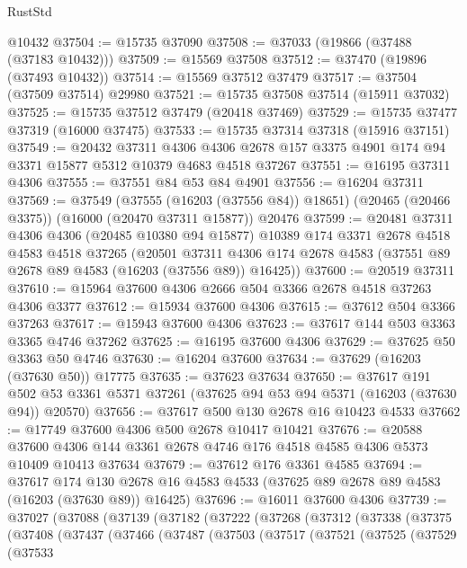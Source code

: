 \begin{lexlean}{RustStd}
\begin{coremodule}
    @10432
@37504 := @15735 @37090
@37508 := @37033 (@19866 (@37488 (@37183 @10432)))
@37509 := @15569 @37508
@37512 := @37470 (@19896 (@37493 @10432))
@37514 := @15569 @37512 @37479
@37517 := @37504 (@37509 @37514) @29980
@37521 := @15735 @37508 @37514 (@15911 @37032)
@37525 := @15735 @37512 @37479 (@20418 @37469)
@37529 := @15735 @37477 @37319 (@16000 @37475)
@37533 := @15735 @37314 @37318 (@15916 @37151)
@37549 := @20432
    @37311
    @4306
    @4306
    @2678
    @157
    @3375
    @4901
    @174
    @94
    @3371
    @15877
    @5312
    @10379
    @4683
    @4518
    @37267
@37551 := @16195 @37311 @4306
@37555 := @37551 @84 @53 @84 @4901
@37556 := @16204 @37311
@37569 := @37549
    (@37555 (@16203 (@37556 @84)) @18651)
    (@20465 (@20466 @3375))
    (@16000 (@20470 @37311 @15877))
    @20476
@37599 := @20481
    @37311
    @4306
    @4306
    (@20485 @10380 @94 @15877)
    @10389
    @174
    @3371
    @2678
    @4518
    @4583
    @4518
    @37265
    (@20501 @37311 @4306 @174 @2678 @4583 (@37551 @89 @2678 @89 @4583 (@16203 (@37556 @89)) @16425))
@37600 := @20519 @37311
@37610 := @15964 @37600 @4306 @2666 @504 @3366 @2678 @4518 @37263 @4306 @3377
@37612 := @15934 @37600 @4306
@37615 := @37612 @504 @3366 @37263
@37617 := @15943 @37600 @4306
@37623 := @37617 @144 @503 @3363 @3365 @4746 @37262
@37625 := @16195 @37600 @4306
@37629 := @37625 @50 @3363 @50 @4746
@37630 := @16204 @37600
@37634 := @37629 (@16203 (@37630 @50)) @17775
@37635 := @37623 @37634
@37650 := @37617
    @191
    @502
    @53
    @3361
    @5371
    @37261
    (@37625 @94 @53 @94 @5371 (@16203 (@37630 @94)) @20570)
@37656 := @37617 @500 @130 @2678 @16 @10423 @4533
@37662 := @17749 @37600 @4306 @500 @2678 @10417 @10421
@37676 := @20588
    @37600
    @4306
    @144
    @3361
    @2678
    @4746
    @176
    @4518
    @4585
    @4306
    @5373
    @10409
    @10413
    @37634
@37679 := @37612 @176 @3361 @4585
@37694 := @37617
    @174
    @130
    @2678
    @16
    @4583
    @4533
    (@37625 @89 @2678 @89 @4583 (@16203 (@37630 @89)) @16425)
@37696 := @16011 @37600 @4306
@37739 := @37027
    (@37088
      (@37139
        (@37182
          (@37222
            (@37268
              (@37312
                (@37338
                  (@37375
                    (@37408
                      (@37437
                        (@37466
                          (@37487
                            (@37503
                              (@37517
                                (@37521
                                  (@37525
                                    (@37529
                                      (@37533

\end{coremodule}
\end{lexlean}
